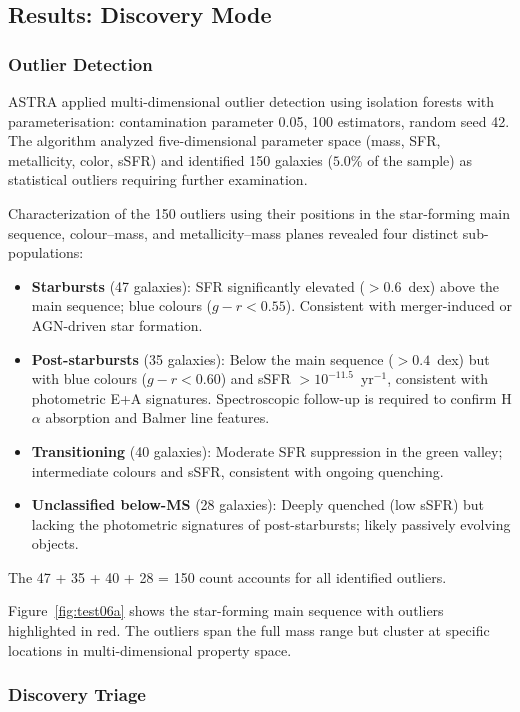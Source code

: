 \documentclass[usenatbib]{rasti}
\begin{document}
\subsection{Results: Discovery Mode}

\subsubsection{Outlier Detection}

ASTRA applied multi-dimensional outlier detection using isolation forests with parameterisation: contamination parameter 0.05, 100 estimators, random seed 42. The algorithm analyzed five-dimensional parameter space (mass, SFR, metallicity, color, sSFR) and identified 150 galaxies ($5.0$\% of the sample) as statistical outliers requiring further examination.

Characterization of the 150 outliers using their positions in the star-forming main sequence, colour--mass, and metallicity--mass planes revealed four distinct sub-populations:
\begin{itemize}
\item \textbf{Starbursts} (47 galaxies): SFR significantly elevated ($> 0.6$~dex) above the main sequence; blue colours ($g-r < 0.55$). Consistent with merger-induced or AGN-driven star formation.
\item \textbf{Post-starbursts} (35 galaxies): Below the main sequence ($> 0.4$~dex) but with blue colours ($g-r < 0.60$) and sSFR $> 10^{-11.5}$~yr$^{-1}$, consistent with photometric E+A signatures. Spectroscopic follow-up is required to confirm H$\alpha$ absorption and Balmer line features.
\item \textbf{Transitioning} (40 galaxies): Moderate SFR suppression in the green valley; intermediate colours and sSFR, consistent with ongoing quenching.
\item \textbf{Unclassified below-MS} (28 galaxies): Deeply quenched (low sSFR) but lacking the photometric signatures of post-starbursts; likely passively evolving objects.
\end{itemize}
The 47 + 35 + 40 + 28 = 150 count accounts for all identified outliers.

Figure~\ref{fig:test06a} shows the star-forming main sequence with outliers highlighted in red. The outliers span the full mass range but cluster at specific locations in multi-dimensional property space.

\subsubsection{Discovery Triage}
\end{document}
